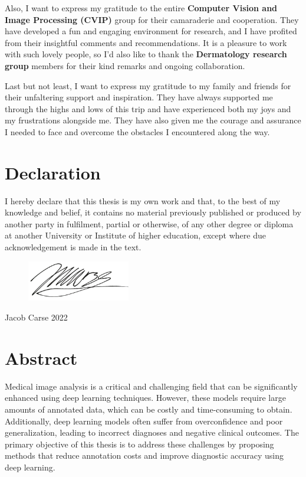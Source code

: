\documentclass[12pt]{report}
\begin{document}
	Also, I want to express my gratitude to the entire \textbf{Computer Vision and Image Processing (CVIP)} group for their camaraderie and cooperation. They have developed a fun and engaging environment for research, and I have profited from their insightful comments and recommendations. It is a pleasure to work with such lovely people, so I'd also like to thank the \textbf{Dermatology research group} members for their kind remarks and ongoing collaboration.
	
	Last but not least, I want to express my gratitude to my family and friends for their unfaltering support and inspiration. They have always supported me through the highs and lows of this trip and have experienced both my joys and my frustrations alongside me. They have also given me the courage and assurance I needed to face and overcome the obstacles I encountered along the way.
	
	\newpage
	\chapter*{Declaration}
	I hereby declare that this thesis is my own work and that, to the best of my knowledge and belief, it contains no material previously published or produced by another party in fulfilment, partial or otherwise, of any other degree or diploma at another University or Institute of higher education, except where due acknowledgement is made in the text.
	
	\vspace{30pt}
	\begin{flushright}
		\begin{figure}[h]
			\begin{flushright}
				\includegraphics[width=0.4\textwidth]{images/signature.png}
			\end{flushright}
		\end{figure}
	
		Jacob Carse
		2022
	
	\end{flushright}

	\newpage
	\chapter*{Abstract}
	Medical image analysis is a critical and challenging field that can be significantly enhanced using deep learning techniques. However, these models require large amounts of annotated data, which can be costly and time-consuming to obtain. Additionally, deep learning models often suffer from overconfidence and poor generalization, leading to incorrect diagnoses and negative clinical outcomes. The primary objective of this thesis is to address these challenges by proposing methods that reduce annotation costs and improve diagnostic accuracy using deep learning.
	
\end{document}
